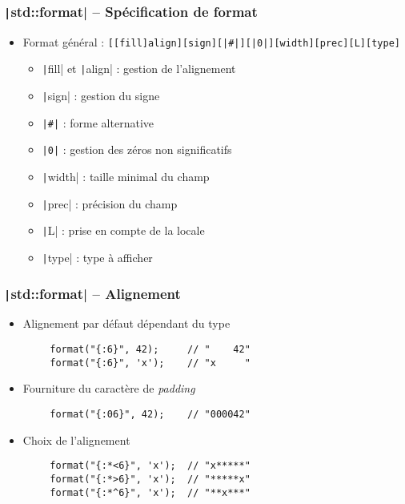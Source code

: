 \documentclass[C++.tex]{subfiles}
\begin{document}
\begin{frame}[fragile]
	\frametitle{\texttt|std::format| -- Spécification de format}
	\begin{itemize}
		\item Format général : \texttt{[[fill]align][sign][|#|][|0|][width][prec][L][type]}
		\begin{itemize}
			\item \texttt|fill| et \texttt|align| : gestion de l'alignement
			\item \texttt|sign| : gestion du signe
			\item \texttt{|#|} : forme alternative
			\item \texttt{|0|} : gestion des zéros non significatifs
			\item \texttt|width| : taille minimal du champ
			\item \texttt|prec| : précision du champ
			\item \texttt|L| : prise en compte de la locale
			\item \texttt|type| : type à afficher
		\end{itemize}
	\end{itemize}
\end{frame}

\begin{frame}[fragile]
	\frametitle{\texttt|std::format| -- Alignement}
	\begin{itemize}
		\item Alignement par défaut dépendant du type
	\end{itemize}

	\begin{verbatim}
		format("{:6}", 42);     // "    42"
		format("{:6}", 'x');    // "x     "
	\end{verbatim}

	\begin{itemize}
		\item Fourniture du caractère de \textit{padding}
	\end{itemize}

	\begin{verbatim}
		format("{:06}", 42);    // "000042"
	\end{verbatim}

	\begin{itemize}
		\item Choix de l'alignement
	\end{itemize}

	\begin{verbatim}
		format("{:*<6}", 'x');  // "x*****"
		format("{:*>6}", 'x');  // "*****x"
		format("{:*^6}", 'x');  // "**x***"
	\end{verbatim}
\end{frame}
\end{document}
